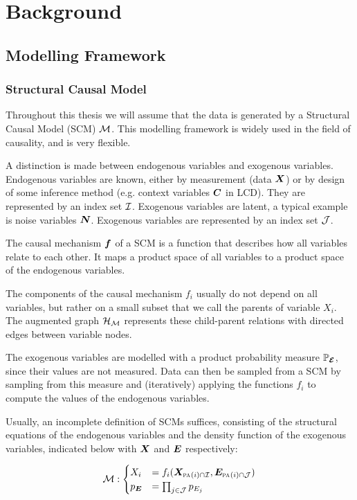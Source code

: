 \newpage
\section{Background}
\label{chapter:background}

\subsection{Modelling Framework}

\subsubsection{Structural Causal Model}
Throughout this thesis we will assume that the data is generated by a Structural Causal Model (SCM) $\mathcal{M}$. This modelling framework is widely used in the field of causality, and is very flexible. 

A distinction is made between endogenous variables and exogenous variables. Endogenous variables are known, either by measurement (data $\bm{X}$) or by design of some inference method (e.g. context variables $\bm{C}$ in LCD). They are represented by an index set $\mathcal{I}$. Exogenous variables are latent, a typical example is noise variables $\bm{N}$. Exogenous variables are represented by an index set $\mathcal{J}$.

The causal mechanism $\bm{f}$ of a SCM is a function that describes how all variables relate to each other. It maps a product space of all variables to a product space of the endogenous variables. 

The components of the causal mechanism $f_i$ usually do not depend on all variables, but rather on a small subset that we call the parents of variable $X_i$. The augmented graph $\mathcal{H}_{\mathcal{M}}$ represents these child-parent relations with directed edges between variable nodes.

The exogenous variables are modelled with a product probability measure $\mathbb{P}_{\bm{\mathcal{E}}}$, since their values are not measured. Data can then be sampled from a SCM by sampling from this measure and (iteratively) applying the functions $f_i$ to compute the values of the endogenous variables.

Usually, an incomplete definition of SCMs suffices, consisting of the structural equations of the endogenous variables and the density function of the exogenous variables, indicated below with $\bm{X}$ and $\bm{E}$ respectively:

$$\mathcal{M}: \begin{cases}
    X_i &= f_i(\bm{X}_{\text{\normalfont\scshape pa}_{}(i) \cap \mathcal{I}}, \bm{E}_{\text{\normalfont\scshape pa}_{}(i) \cap \mathcal{J}}) \\
    p_{\bm{E}} & = \prod_{j\in\mathcal{J}} p_{E_j}
\end{cases}$$

